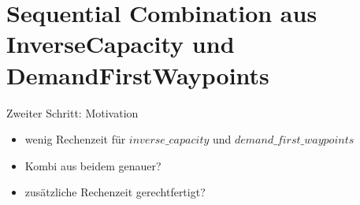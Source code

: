 \documentclass[aspectratio=169,10pt]{beamer}
\begin{document}

\section{Sequential Combination aus InverseCapacity und DemandFirstWaypoints}
\begin{frame}{Zweiter Schritt: Motivation}
\Large
\begin{itemize}
    \item wenig Rechenzeit f\"ur $inverse\_capacity$ und $demand\_first\_waypoints$
    \item Kombi aus beidem genauer?
    \item zus\"atzliche Rechenzeit gerechtfertigt?
\end{itemize}
\end{frame}
\end{document}
